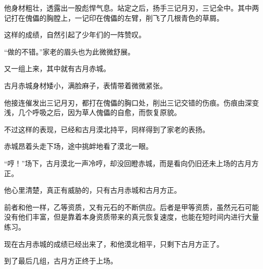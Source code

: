 \begin{this_body}
他身材粗壮，透露出一股彪悍气息。站定之后，扬手三记月刃，三记全中。其中两记打在傀儡的胸膛上，一记印在傀儡的左臂，削飞了几根青色的草屑。

这样的成绩，自然引起了少年们的一阵赞叹。

“做的不错。”家老的眉头也为此微微舒展。

又一组上来，其中就有古月赤城。

古月赤城身材矮小，满脸麻子，表情带着微微紧张。

他接连催发出三记月刃，都打在傀儡的胸口处，削出三记交错的伤痕。伤痕由深变浅，几个呼吸之后，因为草人傀儡的自愈，而恢复原貌。

不过这样的表现，已经和古月漠北持平，同样得到了家老的表扬。

赤城昂着头走下场，途中挑衅地看了漠北一眼。

“哼！”场下，古月漠北一声冷哼，却没回瞪赤城，而是看向仍旧还未上场的古月方正。

他心里清楚，真正有威胁的，只有古月赤城和古月方正。

前者和他一样，乙等资质，又有元石的不断供应。后者是甲等资质，虽然元石可能没有他们丰富，但是靠着本身资质带来的真元恢复速度，也能在短时间内进行大量练习。

现在古月赤城的成绩已经出来了，和他漠北相平，只剩下古月方正了。

到了最后几组，古月方正终于上场。

\end{this_body}


